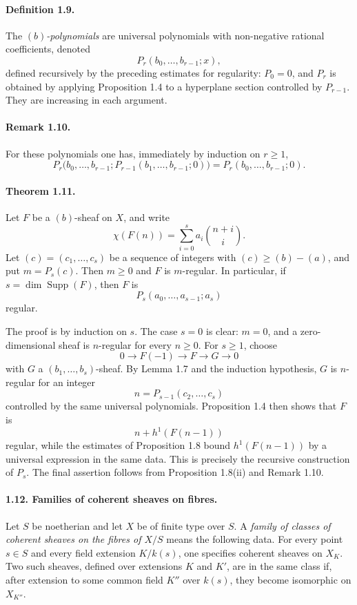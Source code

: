 \documentclass[11pt]{article}
\theoremstyle{plain}
\theoremstyle{definition}
\theoremstyle{remark}
\begin{document}
\paragraph{Definition 1.9.}
The \emph{$(b)$-polynomials} are universal polynomials with non-negative rational coefficients, denoted
\[
P_r(b_0,\ldots,b_{r-1};x),
\]
defined recursively by the preceding estimates for regularity: $P_0=0$, and $P_r$ is obtained by applying Proposition 1.4 to a hyperplane section controlled by $P_{r-1}$. They are increasing in each argument.

\paragraph{Remark 1.10.}
For these polynomials one has, immediately by induction on $r\geq1$,
\[
P_r\bigl(b_0,\ldots,b_{r-1};P_{r-1}(b_1,\ldots,b_{r-1};0)\bigr)
 =P_r(b_0,\ldots,b_{r-1};0).
\]

\paragraph{Theorem 1.11.}
Let $F$ be a $(b)$-sheaf on $X$, and write
\[
\chi(F(n))=\sum_{i=0}^s a_i\binom{n+i}{i}.
\]
Let $(c)=(c_1,\ldots,c_s)$ be a sequence of integers with $(c)\geq (b)-(a)$, and put $m=P_s(c)$. Then $m\geq0$ and $F$ is $m$-regular. In particular, if $s=\dim\operatorname{Supp}(F)$, then $F$ is
\[
P_s(a_0,\ldots,a_{s-1};a_s)
\]
regular.

The proof is by induction on $s$. The case $s=0$ is clear: $m=0$, and a zero-dimensional sheaf is $n$-regular for every $n\geq0$. For $s\geq1$, choose
\[
0\to F(-1)\to F\to G\to0
\]
with $G$ a $(b_1,\ldots,b_s)$-sheaf. By Lemma 1.7 and the induction hypothesis, $G$ is $n$-regular for an integer
\[
n=P_{s-1}(c_2,\ldots,c_s)
\]
controlled by the same universal polynomials. Proposition 1.4 then shows that $F$ is
\[
n+h^1(F(n-1))
\]
regular, while the estimates of Proposition 1.8 bound $h^1(F(n-1))$ by a universal expression in the same data. This is precisely the recursive construction of $P_s$. The final assertion follows from Proposition 1.8(ii) and Remark 1.10.

\paragraph{1.12. Families of coherent sheaves on fibres.}
Let $S$ be noetherian and let $X$ be of finite type over $S$. A \emph{family of classes of coherent sheaves on the fibres of $X/S$} means the following data. For every point $s\in S$ and every field extension $K/k(s)$, one specifies coherent sheaves on $X_K$. Two such sheaves, defined over extensions $K$ and $K'$, are in the same class if, after extension to some common field $K''$ over $k(s)$, they become isomorphic on $X_{K''}$.
\end{document}
